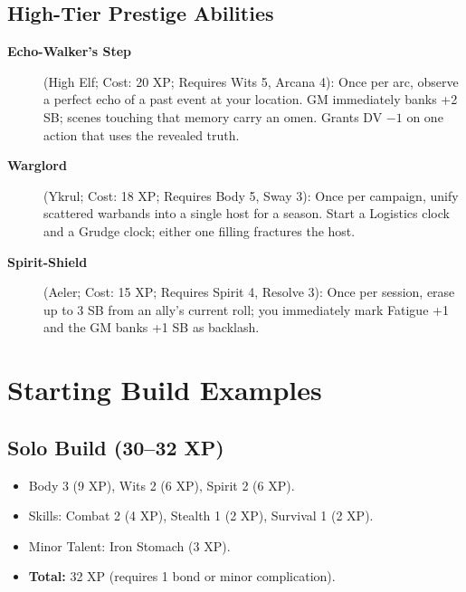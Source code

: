 \subsection{High-Tier Prestige Abilities}
\label{subsec:high-tier-prestige}

\begin{description}
\item[\textbf{Echo-Walker's Step}] (High Elf; Cost: 20 XP; Requires Wits 5, Arcana 4): Once per arc, observe a perfect echo of a past event at your location. GM immediately banks +2 SB; scenes touching that memory carry an omen. Grants DV $-1$ on one action that uses the revealed truth.
\item[\textbf{Warglord}] (Ykrul; Cost: 18 XP; Requires Body 5, Sway 3): Once per campaign, unify scattered warbands into a single host for a season. Start a Logistics clock and a Grudge clock; either one filling fractures the host.
\item[\textbf{Spirit-Shield}] (Aeler; Cost: 15 XP; Requires Spirit 4, Resolve 3): Once per session, erase up to 3 SB from an ally's current roll; you immediately mark Fatigue +1 and the GM banks +1 SB as backlash.
\end{description}

\section{Starting Build Examples}
\label{sec:starting-examples}

\subsection{Solo Build (30--32 XP)}
\label{subsec:solo-example}

\begin{itemize}
\item Body 3 (9 XP), Wits 2 (6 XP), Spirit 2 (6 XP).
\item Skills: Combat 2 (4 XP), Stealth 1 (2 XP), Survival 1 (2 XP).
\item Minor Talent: Iron Stomach (3 XP).
\item \textbf{Total:} 32 XP (requires 1 bond or minor complication).
\end{itemize}

